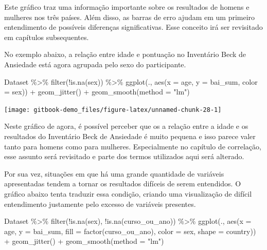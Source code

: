 \documentclass[
]{book}
\newenvironment{Shaded}{\begin{snugshade}}{\end{snugshade}}
\newcommand{\AttributeTok}[1]{\textcolor[rgb]{0.77,0.63,0.00}{#1}}
\newcommand{\FunctionTok}[1]{\textcolor[rgb]{0.00,0.00,0.00}{#1}}
\newcommand{\NormalTok}[1]{#1}
\newcommand{\SpecialCharTok}[1]{\textcolor[rgb]{0.00,0.00,0.00}{#1}}
\newcommand{\StringTok}[1]{\textcolor[rgb]{0.31,0.60,0.02}{#1}}
\begin{document}
Este gráfico traz uma informação importante sobre os resultados de homens e mulheres nos três países. Além disso, as barras de erro ajudam em um primeiro entendimento de possíveis diferenças significativas. Esse conceito irá ser revisitado em capítulos subsequentes.

No exemplo abaixo, a relação entre idade e pontuação no Inventário Beck de Ansiedade está agora agrupada pelo sexo do participante.

\begin{Shaded}
\begin{Highlighting}[]
\NormalTok{Dataset }\SpecialCharTok{\%\textgreater{}\%} 
  \FunctionTok{filter}\NormalTok{(}\SpecialCharTok{!}\FunctionTok{is.na}\NormalTok{(sex)) }\SpecialCharTok{\%\textgreater{}\%} 
  \FunctionTok{ggplot}\NormalTok{(., }\FunctionTok{aes}\NormalTok{(}\AttributeTok{x =}\NormalTok{ age, }\AttributeTok{y =}\NormalTok{ bai\_sum, }\AttributeTok{color =}\NormalTok{ sex)) }\SpecialCharTok{+}
  \FunctionTok{geom\_jitter}\NormalTok{() }\SpecialCharTok{+}
  \FunctionTok{geom\_smooth}\NormalTok{(}\AttributeTok{method =} \StringTok{"lm"}\NormalTok{) }
\end{Highlighting}
\end{Shaded}

\begin{center}\texttt{[image: gitbook-demo\_files/figure-latex/unnamed-chunk-28-1]} \end{center}

Neste gráfico de agora, é possível perceber que os a relação entre a idade e os resultados do Inventário Beck de Ansiedade é muito pequena e isso parece valer tanto para homens como para mulheres. Especialmente no capítulo de correlação, esse assunto será revisitado e parte dos termos utilizados aqui será alterado.

Por sua vez, situações em que há uma grande quantidade de variáveis apresentadas tendem a tornar os resultados difíceis de serem entendidos. O gráfico abaixo tenta traduzir essa condição, criando uma visualização de difícil entendimento justamente pelo excesso de variáveis presentes.

\begin{Shaded}
\begin{Highlighting}[]
\NormalTok{Dataset }\SpecialCharTok{\%\textgreater{}\%} 
  \FunctionTok{filter}\NormalTok{(}\SpecialCharTok{!}\FunctionTok{is.na}\NormalTok{(sex), }\SpecialCharTok{!}\FunctionTok{is.na}\NormalTok{(curso\_ou\_ano)) }\SpecialCharTok{\%\textgreater{}\%} 
  \FunctionTok{ggplot}\NormalTok{(., }\FunctionTok{aes}\NormalTok{(}\AttributeTok{x =}\NormalTok{ age, }\AttributeTok{y =}\NormalTok{ bai\_sum, }
                \AttributeTok{fill =} \FunctionTok{factor}\NormalTok{(curso\_ou\_ano), }
                \AttributeTok{color =}\NormalTok{ sex, }\AttributeTok{shape =}\NormalTok{ country)) }\SpecialCharTok{+}
  \FunctionTok{geom\_jitter}\NormalTok{() }\SpecialCharTok{+}
  \FunctionTok{geom\_smooth}\NormalTok{(}\AttributeTok{method =} \StringTok{"lm"}\NormalTok{) }
\end{Highlighting}
\end{Shaded}
\end{document}
